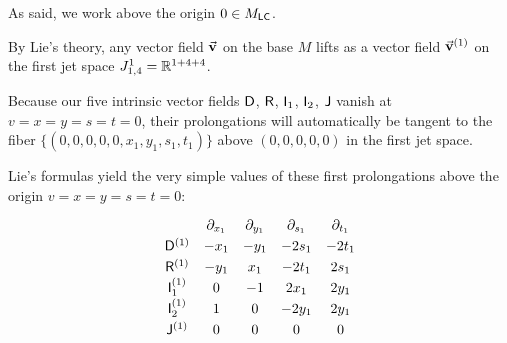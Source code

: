 \documentclass[12pt,twoside,leqno,openany]{amsart}
\begin{document}
\label{prolongations-jet-1}

As said, we work above the origin $0 \in M_{\sf LC}$. 

\begin{center}

\end{center}

By Lie's theory, any vector field $\vec{\bf v}$ on the base $M$ lifts
as a vector field $\vec{\bf v}^{(1)}$ on the first jet space
$J_{1,4}^1 = \mathbb{R}^{1+4+4}$.

Because our five intrinsic vector fields ${\sf D}$, ${\sf R}$, ${\sf
I}_1$, ${\sf I}_2$, ${\sf J}$ vanish at $v = x = y = s = t= 0$,
their prolongations will automatically be tangent to the fiber $\big\{
(0, 0, 0, 0, 0, x_1, y_1, s_1, t_1) \big\}$ above 
$(0,0,0,0,0)$ in the first jet space.

Lie's formulas yield the very simple values of these first
prolongations above the origin
$v=x=y=s=t=0$:
\[
\def\arraystretch{1.25}
\begin{array}{ccccc}
& \partial_{x_1} & \partial_{y_1} & \partial_{s_1} & \partial_{t_1}
\\
{\sf D}^{(1)} & -x_1 & -y_1 & -2s_1 & -2t_1
\\
{\sf R}^{(1)} & -y_1 & x_1 & -2t_1 & 2s_1
\\
{\sf I}_1^{(1)} & 0 & -1 & 2x_1 & 2y_1
\\
{\sf I}_2^{(1)} & 1 & 0 & -2y_1 & 2y_1
\\
{\sf J}^{(1)} & 0 & 0 & 0 & 0
\end{array}
\]
\end{document}
